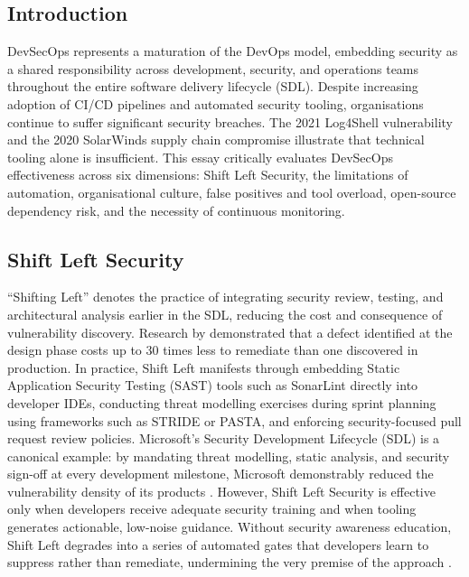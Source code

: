 \documentclass[12pt,a4paper]{article}
\begin{document}
\vspace{0.5em}

\subsection*{Introduction}

DevSecOps represents a maturation of the DevOps model, embedding security as a shared
responsibility across development, security, and operations teams throughout the entire
software delivery lifecycle (SDL). Despite increasing adoption of CI/CD pipelines and
automated security tooling, organisations continue to suffer significant security breaches.
The 2021 Log4Shell vulnerability and the 2020 SolarWinds supply chain compromise
illustrate that technical tooling alone is insufficient. This essay critically evaluates
DevSecOps effectiveness across six dimensions: Shift Left Security, the limitations of
automation, organisational culture, false positives and tool overload, open-source
dependency risk, and the necessity of continuous monitoring.

\subsection*{Shift Left Security}

``Shifting Left'' denotes the practice of integrating security review, testing, and
architectural analysis earlier in the SDL, reducing the cost and consequence of
vulnerability discovery. Research by \citet{ibm2012} demonstrated that a defect identified
at the design phase costs up to 30 times less to remediate than one discovered in
production. In practice, Shift Left manifests through embedding Static Application Security
Testing (SAST) tools such as SonarLint directly into developer IDEs, conducting threat
modelling exercises during sprint planning using frameworks such as STRIDE or PASTA, and
enforcing security-focused pull request review policies. Microsoft's Security Development
Lifecycle (SDL) is a canonical example: by mandating threat modelling, static analysis, and
security sign-off at every development milestone, Microsoft demonstrably reduced the
vulnerability density of its products \citep{howard2006}. However, Shift Left Security is
effective only when developers receive adequate security training and when tooling generates
actionable, low-noise guidance. Without security awareness education, Shift Left degrades
into a series of automated gates that developers learn to suppress rather than remediate,
undermining the very premise of the approach \citep{johnson2013}.
\end{document}
